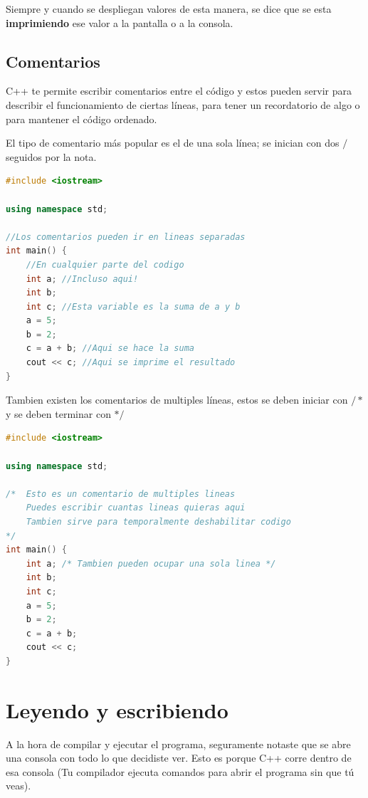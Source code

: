 \documentclass{article}
\begin{document}
Siempre y cuando se despliegan valores de esta manera, se dice que se esta \textbf{imprimiendo} ese valor a la pantalla o a la consola.

\subsection{Comentarios}

C++ te permite escribir comentarios entre el código y estos pueden servir para describir el funcionamiento de ciertas líneas, para tener un recordatorio de algo o para mantener el código ordenado.

El tipo de comentario más popular es el de una sola línea; se inician con dos $/$ seguidos por la nota.

\begin{lstlisting}[language=C++, caption=Comentario]
#include <iostream>

using namespace std;

//Los comentarios pueden ir en lineas separadas
int main() {
    //En cualquier parte del codigo
    int a; //Incluso aqui!
    int b; 
    int c; //Esta variable es la suma de a y b
    a = 5;
    b = 2;
    c = a + b; //Aqui se hace la suma
    cout << c; //Aqui se imprime el resultado
}
\end{lstlisting}

Tambien existen los comentarios de multiples líneas, estos se deben iniciar con $/*$ y se deben terminar con $*/$

\begin{lstlisting}[language=C++, caption=Comentario]
#include <iostream>

using namespace std;

/*  Esto es un comentario de multiples lineas
    Puedes escribir cuantas lineas quieras aqui
    Tambien sirve para temporalmente deshabilitar codigo
*/
int main() {
    int a; /* Tambien pueden ocupar una sola linea */
    int b; 
    int c;
    a = 5;
    b = 2;
    c = a + b;
    cout << c;
}
\end{lstlisting}

\section{Leyendo y escribiendo}

A la hora de compilar y ejecutar el programa, seguramente notaste que se abre una consola con todo lo que decidiste ver. Esto es porque C++ corre dentro de esa consola (Tu compilador ejecuta comandos para abrir el programa sin que tú veas).
\end{document}
